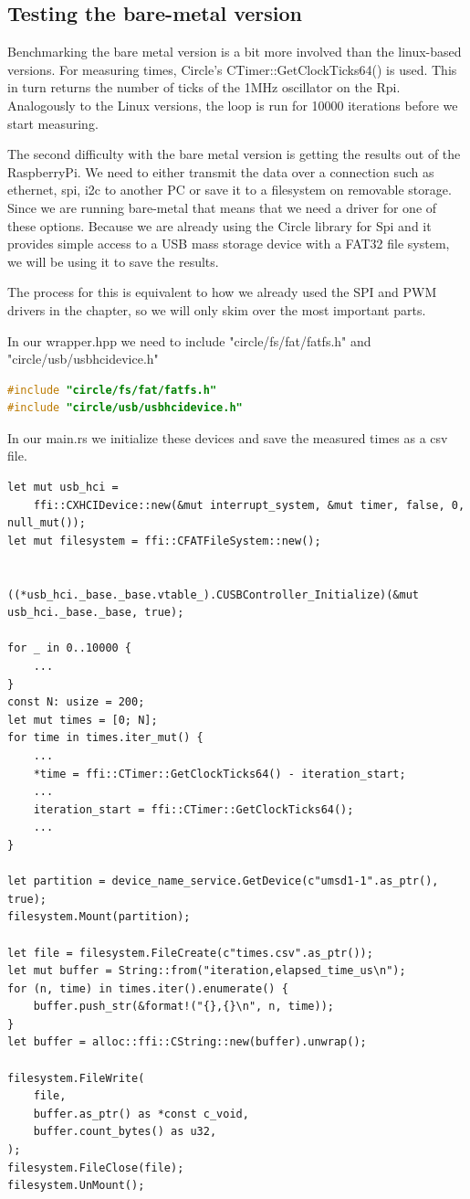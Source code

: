 \subsection{Testing the bare-metal version}
Benchmarking the bare metal version is a bit more involved than the linux-based versions.
For measuring times, Circle's CTimer::GetClockTicks64() is used. This in turn returns the number of ticks of the 1MHz oscillator on the Rpi.
Analogously to the Linux versions, the loop is run for 10000 iterations before we start measuring.

The second difficulty with the bare metal version is getting the results out of the RaspberryPi.
We need to either transmit the data over a connection such as ethernet, spi, i2c to another PC or save it to a filesystem on removable storage.
Since we are running bare-metal that means that we need a driver for one of these options.
Because we are already using the Circle library for Spi and it provides simple access to a USB mass storage device with a FAT32 file system, we will be using it to save the results.

The process for this is equivalent to how we already used the SPI and PWM drivers in the  chapter,
so we will only skim over the most important parts.

In our wrapper.hpp we need to include "circle/fs/fat/fatfs.h" and "circle/usb/usbhcidevice.h"
\begin{lstlisting}[language=C++]
#include "circle/fs/fat/fatfs.h"
#include "circle/usb/usbhcidevice.h"
\end{lstlisting}

In our main.rs we initialize these devices and save the measured times as a csv file.
\begin{lstlisting}
let mut usb_hci =
    ffi::CXHCIDevice::new(&mut interrupt_system, &mut timer, false, 0, null_mut());
let mut filesystem = ffi::CFATFileSystem::new();


((*usb_hci._base._base.vtable_).CUSBController_Initialize)(&mut usb_hci._base._base, true);

for _ in 0..10000 {
    ...
}
const N: usize = 200;
let mut times = [0; N];
for time in times.iter_mut() {
    ...
    *time = ffi::CTimer::GetClockTicks64() - iteration_start;
    ...
    iteration_start = ffi::CTimer::GetClockTicks64();
    ...
}

let partition = device_name_service.GetDevice(c"umsd1-1".as_ptr(), true);
filesystem.Mount(partition);

let file = filesystem.FileCreate(c"times.csv".as_ptr());
let mut buffer = String::from("iteration,elapsed_time_us\n");
for (n, time) in times.iter().enumerate() {
    buffer.push_str(&format!("{},{}\n", n, time));
}
let buffer = alloc::ffi::CString::new(buffer).unwrap();

filesystem.FileWrite(
    file,
    buffer.as_ptr() as *const c_void,
    buffer.count_bytes() as u32,
);
filesystem.FileClose(file);
filesystem.UnMount();
\end{lstlisting}

